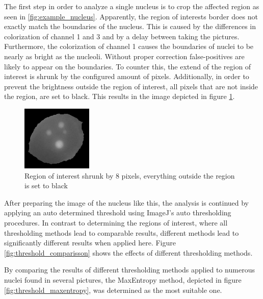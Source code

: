 \documentclass[a4paper, 12pt]{article}
\begin{document}
The first step in order to analyze a single nucleus is to crop the affected
region as seen in \ref{fig:example_nucleus}. Apparently, the region of interests
border does not exactly match the boundaries of the nucleus. This is caused by
the differences in colorization of channel 1 and 3 and by a delay between taking
the pictures. Furthermore, the colorization of channel 1 causes the boundaries
of nuclei to be nearly as bright as the nucleoli. Without proper correction
false-positives are likely to appear on the boundaries. To counter this, the
extend of the region of interest is shrunk by the configured amount of pixels.
Additionally, in order to prevent the brightness outside the region of interest,
all pixels that are not inside the region, are set to black. This results in the
image depicted in figure \ref{fig:example_nucleus_shrinked_blacked}.

\begin{figure}
\vspace{-14pt}
\includegraphics[width=0.3\textwidth]{images/example_nucleus_shrinked8_blacked}
\caption{Region of interest shrunk by 8 pixels, everything outside the region
is set to black}
\label{fig:example_nucleus_shrinked_blacked}
\end{figure}

After preparing the image of the nucleus like this, the analysis is continued by
applying an auto determined threshold using ImageJ's auto thresholding
procedures. In contrast to determining the regions of interest, where all
thresholding methods lead to comparable results, different methods lead to
significantly different results when applied here. Figure
\ref{fig:threshold_comparisson} shows the effects of different thresholding
methods.

By comparing the results of different thresholding methods applied to numerous
nuclei found in several pictures, the MaxEntropy method, depicted in figure
\ref{fig:threshold_maxentropy}, was determined as the most suitable one.
\end{document}
